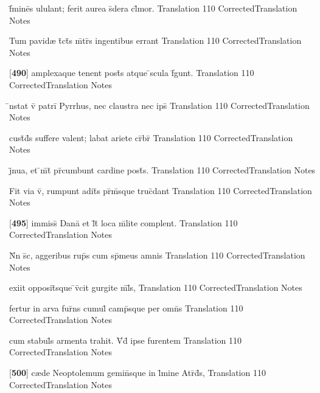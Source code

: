 \latline
  {f\={}mine\={\macron {\i}}s ululant; ferit aurea s\={\macron {\i}}dera cl\={}mor.}
  { Translation }
  {110}
  { CorrectedTranslation }
  { Notes }


\latline
  {Tum pavid{\ae} t\={}ct\={\macron {\i}}s m\={}tr\={}s ingentibus errant}
  { Translation }
  {110}
  { CorrectedTranslation }
  { Notes }


\latline
  {[\textbf{490}] amplexaque tenent post\={\macron {\i}}s atque \={}scula f\={\macron {\i}}gunt.}
  { Translation }
  {110}
  { CorrectedTranslation }
  { Notes }


\latline
  {\={}nstat v\={\macron {\i}} patri\={} Pyrrhus, nec claustra nec ips\={\macron {\i}} }
  { Translation }
  {110}
  { CorrectedTranslation }
  { Notes }


\latline
  {cust\={}d\={}s suffere valent; labat ariete cr\={}br\={}}
  { Translation }
  {110}
  { CorrectedTranslation }
  { Notes }


\latline
  {j\={}nua, et \={}m\={}t\={\macron {\i}} pr\={}cumbunt cardine post\={}s.}
  { Translation }
  {110}
  { CorrectedTranslation }
  { Notes }


\latline
  {Fit via v\={\macron {\i}}, rumpunt adit\={}s pr\={\macron {\i}}m\={}sque truc\={\macron {\i}}dant}
  { Translation }
  {110}
  { CorrectedTranslation }
  { Notes }


\latline
  {[\textbf{495}] immiss\={\macron {\i}} Dana\={\macron {\i}} et l\={}t\={} loca m\={\macron {\i}}lite complent.}
  { Translation }
  {110}
  { CorrectedTranslation }
  { Notes }


\latline
  {N\={}n s\={\macron {\i}}c, aggeribus rup\={\macron {\i}}s cum sp\={}meus amnis}
  { Translation }
  {110}
  { CorrectedTranslation }
  { Notes }


\latline
  {exiit opposit\={}sque \={}v\={\macron {\i}}cit gurgite m\={}l\={}s,}
  { Translation }
  {110}
  { CorrectedTranslation }
  { Notes }


\latline
  {fertur in arva fur\={}ns cumul\={} camp\={}sque per omn\={\macron {\i}}s}
  { Translation }
  {110}
  { CorrectedTranslation }
  { Notes }


\latline
  {cum stabul\={\macron {\i}}s armenta trahit.  V\={\macron {\i}}d\={\macron {\i}} ipse furentem}
  { Translation }
  {110}
  { CorrectedTranslation }
  { Notes }


\latline
  {[\textbf{500}] c{\ae}de Neoptolemum gemin\={}sque in l\={\macron {\i}}mine Atr\={\macron {\i}}d\={}s,}
  { Translation }
  {110}
  { CorrectedTranslation }
  { Notes }


